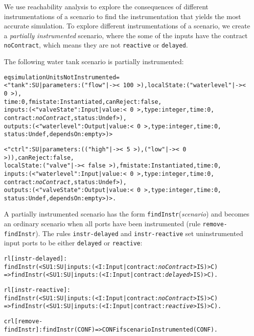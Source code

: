 We use reachability analysis to explore the consequences of different instrumentations of a scenario to find the instrumentation that yields the most accurate simulation.
To explore different instrumentations of a scenario, we create a \emph{partially instrumented} scenario, where the some of the inputs have the contract \texttt{noContract}, which means they are not \texttt{reactive} or \texttt{delayed}.
\begin{example}
  The following water tank scenario is partially instrumented:
\scriptsize
\begin{alltt}
eq simulationUnitsNotInstrumented = 
< "tank" : SU | parameters : ("flow" |-> <\,100\,>),  localState : ("waterlevel" |-> <\,0\,>),
                time : 0,  fmistate : Instantiated, canReject : false, 
                inputs : (< "valveState" : Input | value : <\,0\,>, type : integer, time : 0,
                                                   contract : \emph{noContract}, status : Undef >), 
                outputs : (< "waterlevel" : Output | value : <\,0\,>, type : integer, time : 0,
                                                     status : Undef, dependsOn : empty >) >

< "ctrl" : SU | parameters : (("high" |-> <\,5\,>) , ("low" |-> <\,0\,>)), canReject : false, 
                localState : ("valve" |-> <\,false\,>), fmistate : Instantiated, time : 0, 
                inputs : (< "waterlevel" : Input | value : <\,0\,>, type : integer, time : 0,
                                                   contract : \emph{noContract}, status : Undef >), 
                outputs : (< "valveState" : Output | value : <\,0\,>, type : integer, time : 0,
                                                     status : Undef, dependsOn : empty >) > . 

\end{alltt}
\normalsize

\end{example}

A partially instrumented scenario has the form \texttt{findInstr}(\emph{scenario}) and becomes an ordinary scenario when all ports have been instrumented (rule \texttt{remove-findInstr}).
The rules \texttt{instr-delayed} and \texttt{instr-reactive} set uninstrumented input ports to be either \texttt{delayed} or \texttt{reactive}:

\scriptsize
\begin{alltt}
rl [instr-delayed]: 
  findInstr(< SU1 : SU | inputs : (< I : Input | contract : \emph{noContract} > IS) > C)
  => findInstr(< SU1 : SU | inputs : (< I : Input | contract : \emph{delayed}  > IS) > C) .

rl [instr-reactive]: 
  findInstr(< SU1 : SU | inputs : (< I : Input | contract :   \emph{noContract}  > IS) > C)
  => findInstr(< SU1 : SU | inputs : (< I : Input | contract : \emph{reactive}  > IS) > C) .

crl [remove-findInstr]: findInstr(CONF) => CONF if scenarioInstrumented(CONF) .
\end{alltt}
\normalsize

